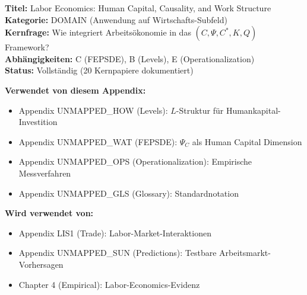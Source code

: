 %


\begin{tcolorbox}[colback=blue!5!white, colframe=blue!75!black, title=\textbf{Appendix MUL1: DOMAIN-LABOR}]
\textbf{Titel:} Labor Economics: Human Capital, Causality, and Work Structure \\
\textbf{Kategorie:} DOMAIN (Anwendung auf Wirtschafts-Subfeld) \\
\textbf{Kernfrage:} Wie integriert Arbeitsökonomie in das $(C, \Psi, C^*, K, Q)$ Framework? \\
\textbf{Abhängigkeiten:} C (FEPSDE), B (Levels), E (Operationalization) \\
\textbf{Status:} Vollständig (20 Kernpapiere dokumentiert)
\end{tcolorbox}

\begin{tcolorbox}[colback=gray!5!white, colframe=gray!75!black, title=\textbf{Cross-Reference Map}]
\small
\textbf{Verwendet von diesem Appendix:}
\begin{itemize}[noitemsep]
    \item Appendix UNMAPPED_HOW (Levels): $L$-Struktur für Humankapital-Investition
    \item Appendix UNMAPPED_WAT (FEPSDE): $\Psi_C$ als Human Capital Dimension
    \item Appendix UNMAPPED_OPS (Operationalization): Empirische Messverfahren
    \item Appendix UNMAPPED_GLS (Glossary): Standardnotation
\end{itemize}
\textbf{Wird verwendet von:}
\begin{itemize}[noitemsep]
    \item Appendix LIS1 (Trade): Labor-Market-Interaktionen
    \item Appendix UNMAPPED_SUN (Predictions): Testbare Arbeitsmarkt-Vorhersagen
    \item Chapter 4 (Empirical): Labor-Economics-Evidenz
\end{itemize}
\end{tcolorbox}

